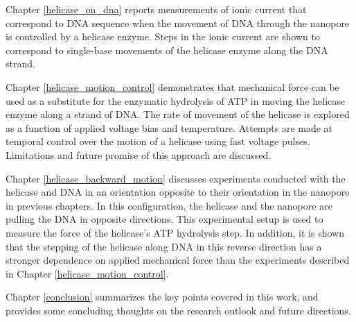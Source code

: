 Chapter \ref{helicase_on_dna} reports measurements of ionic current that correspond to DNA sequence when the movement of DNA through the nanopore is controlled by a helicase enzyme.  Steps in the ionic current are shown to correspond to single-base movements of the helicase enzyme along the DNA strand.

Chapter \ref{helicase_motion_control} demonstrates that mechanical force can be used as a substitute for the enzymatic hydrolysis of ATP in moving the helicase enzyme along a strand of DNA.  The rate of movement of the helicase is explored as a function of applied voltage bias and temperature.  Attempts are made at temporal control over the motion of a helicase using fast voltage pulses.  Limitations and future promise of this approach are discussed.

Chapter \ref{helicase_backward_motion} discusses experiments conducted with the helicase and DNA in an orientation opposite to their orientation in the nanopore in previous chapters.  In this configuration, the helicase and the nanopore are pulling the DNA in opposite directions.  This experimental setup is used to measure the force of the helicase's ATP hydrolysis step.  In addition, it is shown that the stepping of the helicase along DNA in this reverse direction has a stronger dependence on applied mechanical force than the experiments described in Chapter \ref{helicase_motion_control}.

Chapter \ref{conclusion} summarizes the key points covered in this work, and provides some concluding thoughts on the research outlook and future directions.
